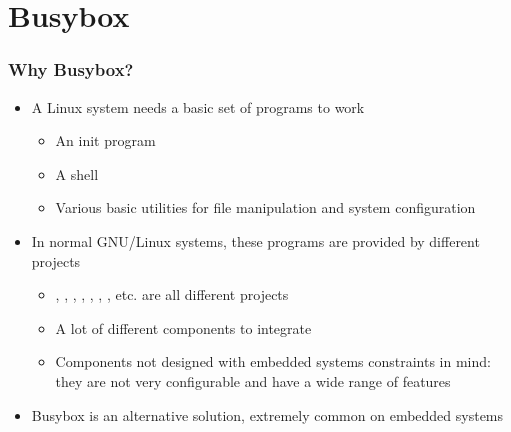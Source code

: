 \section{Busybox}

\begin{frame}
  \frametitle{Why Busybox?}
  \begin{itemize}
  \item A Linux system needs a basic set of programs to work
    \begin{itemize}
    \item An init program
    \item A shell
    \item Various basic utilities for file manipulation and system
      configuration
    \end{itemize}
  \item In normal GNU/Linux systems, these programs are provided by
    different projects
    \begin{itemize}
    \item {}, , , ,
      , , , etc. are all different
      projects
    \item A lot of different components to integrate
    \item Components not designed with embedded systems constraints in
      mind: they are not very configurable and have a wide range of
      features
    \end{itemize}
  \item Busybox is an alternative solution, extremely common on
    embedded systems
  \end{itemize}
\end{frame}


